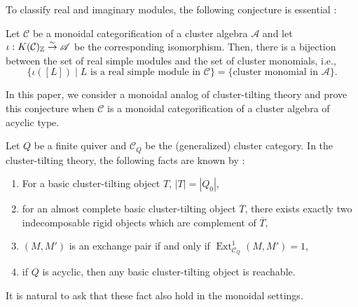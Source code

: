 To classify real and imaginary modules, the following conjecture is essential : 
\begin{Conj}
\label{Conj : real vs monomial intro}
    Let $\mathcal{C}$ be a monoidal categorification of a cluster algebra $\mathscr{A}$ 
    and let $\iota : K(\mathcal{C})_{\mathbb{Z}} \overset{\sim}{\to} \mathscr{A}$ be the corresponding 
    isomorphism. 
    Then, there is a bijection between the set of real simple modules 
    and the set of cluster monomials, i.e., 
    \[
    \{ \iota([L]) \mid L  \text{ is a real simple module in $\mathcal{C}$}\} 
    = \{ \text{cluster monomial in $\mathscr{A}$}\}. 
    \]
\end{Conj}
In this paper, we consider a monoidal analog of cluster-tilting theory and 
prove this conjecture when $\mathscr{C}$ is a monoidal categorification of a cluster algebra of acyclic type. 

Let $Q$ be a finite quiver and $\mathcal{C}_Q$ be the (generalized) cluster category. 
In the cluster-tilting theory, 
the following facts are known by \cite{BMRRT, IY08, DK08, FG} : 
\begin{enumerate}
  \item[(CT1)] For a basic cluster-tilting object $T$, $|T| = |Q_0|$, 
  \item[(CT2)] for an almost complete basic cluster-tilting object $\overline{T}$, 
  there exists exactly two indecomposable rigid objects which are complement of $\overline{T}$, 
  \item[(CT3)] $(M, M')$ is an exchange pair if and only if $\operatorname{Ext}^1_{\mathcal{C}_Q}(M, M') =1$, 
  \item[(CT4)] if $Q$ is acyclic, then any basic cluster-tilting object is reachable. 
\end{enumerate}
It is natural to ask that these fact also hold in the monoidal settings. 


